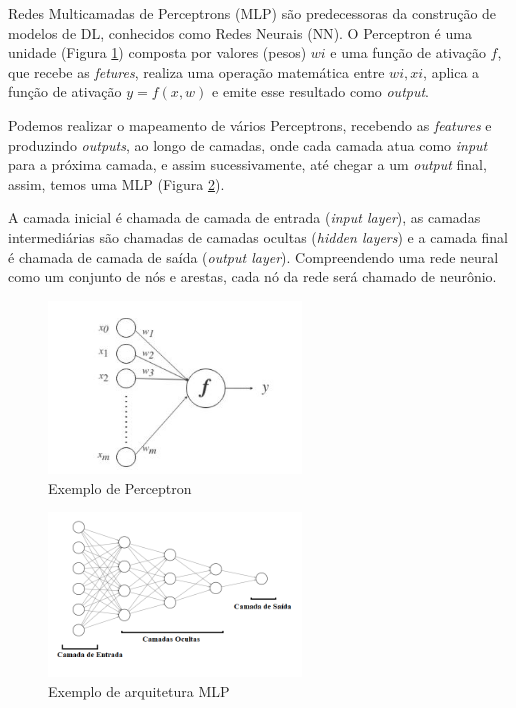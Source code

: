 Redes Multicamadas de Perceptrons (\acrshort{MLP}) são predecessoras da construção de modelos de \acrshort{DL}, conhecidos como Redes Neurais (\acrlong{NN}). O Perceptron é uma unidade (Figura \ref{fig:perceptron}) composta por valores (pesos) $wi$ e uma função de ativação $f$,  que recebe as \textit{fetures}, realiza uma operação matemática entre $wi,xi$, aplica a função de ativação $y = f(x,w)$ e emite esse resultado como \textit{output}.

Podemos realizar o mapeamento de vários Perceptrons, recebendo as \textit{features} e produzindo \textit{outputs}, ao longo de camadas, onde cada camada atua como \textit{input} para a próxima camada, e assim sucessivamente, até chegar a
 um \textit{output} final, assim, temos uma \acrshort{MLP} (Figura \ref{fig:mlp}).
 
 
 A camada inicial é chamada de camada de entrada (\textit{input layer}), as camadas intermediárias são chamadas de camadas ocultas (\textit{hidden layers}) e a camada final é chamada de camada de saída (\textit{output layer}). Compreendendo uma rede neural como um conjunto de nós e arestas, cada nó da rede será chamado de neurônio.

\begin{figure}[!ht]
\centering
\includegraphics[width=0.6\textwidth]{img/perceptron.png}
\caption{\label{fig:perceptron}Exemplo de Perceptron}
\author{Fonte: Retirado de~\cite{12}}
\end{figure}

\begin{figure}[!h]
\centering
\includegraphics[width=0.6\textwidth]{img/mlp03.png}
\caption{\label{fig:mlp}Exemplo de arquitetura \acrshort{MLP}}

\end{figure}

